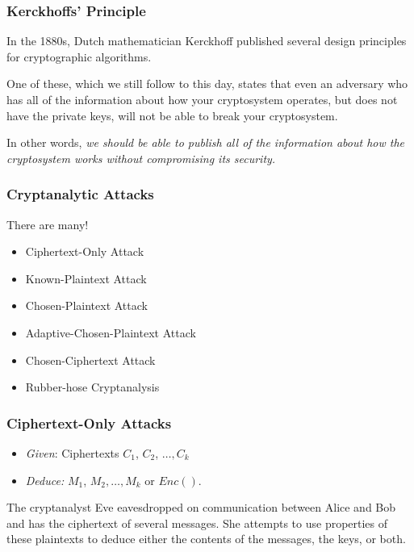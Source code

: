 \documentclass{beamer}
\newcommand{\<}{\langle}
\renewcommand{\>}{\rangle}
\begin{document}
\begin{frame}
\frametitle{Kerckhoffs' Principle}

In the 1880s, Dutch mathematician Kerckhoff published several design principles for cryptographic algorithms. \newline

One of these, which we still follow to this day, states that even an adversary who has all of the information about how your cryptosystem operates, but does not have the private keys, will not be able to break your cryptosystem. \newline

In other words, \emph{we should be able to publish all of the information about how the cryptosystem works without compromising its security.}
\end{frame}

\begin{frame}
\frametitle{Cryptanalytic Attacks}

There are many! 

\begin{itemize}
\item Ciphertext-Only Attack
\item Known-Plaintext Attack
\item Chosen-Plaintext Attack
\item Adaptive-Chosen-Plaintext Attack
\item Chosen-Ciphertext Attack
\item Rubber-hose Cryptanalysis
\end{itemize}
\end{frame}


\begin{frame}
\frametitle{Ciphertext-Only Attacks}

\begin{itemize}
\item \emph{Given}: Ciphertexts $C_1$, $C_2$, $\dots, C_k$
\item \emph{Deduce:} $M_1$, $M_2, \dots, M_k$ or $Enc()$.
\end{itemize}

The cryptanalyst Eve eavesdropped on communication between Alice and Bob and has the ciphertext of several messages. She attempts to use properties of these plaintexts to deduce either the contents of the messages, the keys, or both. 
\end{frame}
\end{document}
